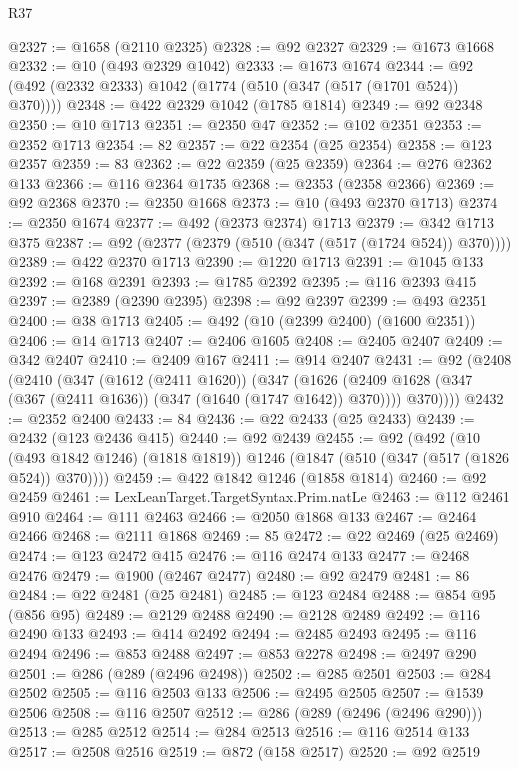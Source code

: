 \begin{lexlean}{R37}
\begin{coremodule}
@2327 := @1658 (@2110 @2325)
@2328 := @92 @2327
@2329 := @1673 @1668
@2332 := @10 (@493 @2329 @1042)
@2333 := @1673 @1674
@2344 := @92 (@492 (@2332 @2333) @1042 (@1774 (@510 (@347 (@517 (@1701 @524)) @370))))
@2348 := @422 @2329 @1042 (@1785 @1814)
@2349 := @92 @2348
@2350 := @10 @1713
@2351 := @2350 @47
@2352 := @102 @2351
@2353 := @2352 @1713
@2354 := 82
@2357 := @22 @2354 (@25 @2354)
@2358 := @123 @2357
@2359 := 83
@2362 := @22 @2359 (@25 @2359)
@2364 := @276 @2362 @133
@2366 := @116 @2364 @1735
@2368 := @2353 (@2358 @2366)
@2369 := @92 @2368
@2370 := @2350 @1668
@2373 := @10 (@493 @2370 @1713)
@2374 := @2350 @1674
@2377 := @492 (@2373 @2374) @1713
@2379 := @342 @1713 @375
@2387 := @92 (@2377 (@2379 (@510 (@347 (@517 (@1724 @524)) @370))))
@2389 := @422 @2370 @1713
@2390 := @1220 @1713
@2391 := @1045 @133
@2392 := @168 @2391
@2393 := @1785 @2392
@2395 := @116 @2393 @415
@2397 := @2389 (@2390 @2395)
@2398 := @92 @2397
@2399 := @493 @2351
@2400 := @38 @1713
@2405 := @492 (@10 (@2399 @2400) (@1600 @2351))
@2406 := @14 @1713
@2407 := @2406 @1605
@2408 := @2405 @2407
@2409 := @342 @2407
@2410 := @2409 @167
@2411 := @914 @2407
@2431 := @92
    (@2408
      (@2410
        (@347
          (@1612 (@2411 @1620))
          (@347
            (@1626 (@2409 @1628 (@347 (@367 (@2411 @1636)) (@347 (@1640 (@1747 @1642)) @370))))
            @370))))
@2432 := @2352 @2400
@2433 := 84
@2436 := @22 @2433 (@25 @2433)
@2439 := @2432 (@123 @2436 @415)
@2440 := @92 @2439
@2455 := @92
    (@492
      (@10 (@493 @1842 @1246) (@1818 @1819))
      @1246
      (@1847 (@510 (@347 (@517 (@1826 @524)) @370))))
@2459 := @422 @1842 @1246 (@1858 @1814)
@2460 := @92 @2459
@2461 := LexLeanTarget.TargetSyntax.Prim.natLe
@2463 := @112 @2461 @910
@2464 := @111 @2463
@2466 := @2050 @1868 @133
@2467 := @2464 @2466
@2468 := @2111 @1868
@2469 := 85
@2472 := @22 @2469 (@25 @2469)
@2474 := @123 @2472 @415
@2476 := @116 @2474 @133
@2477 := @2468 @2476
@2479 := @1900 (@2467 @2477)
@2480 := @92 @2479
@2481 := 86
@2484 := @22 @2481 (@25 @2481)
@2485 := @123 @2484
@2488 := @854 @95 (@856 @95)
@2489 := @2129 @2488
@2490 := @2128 @2489
@2492 := @116 @2490 @133
@2493 := @414 @2492
@2494 := @2485 @2493
@2495 := @116 @2494
@2496 := @853 @2488
@2497 := @853 @2278
@2498 := @2497 @290
@2501 := @286 (@289 (@2496 @2498))
@2502 := @285 @2501
@2503 := @284 @2502
@2505 := @116 @2503 @133
@2506 := @2495 @2505
@2507 := @1539 @2506
@2508 := @116 @2507
@2512 := @286 (@289 (@2496 (@2496 @290)))
@2513 := @285 @2512
@2514 := @284 @2513
@2516 := @116 @2514 @133
@2517 := @2508 @2516
@2519 := @872 (@158 @2517)
@2520 := @92 @2519

\end{coremodule}
\end{lexlean}
